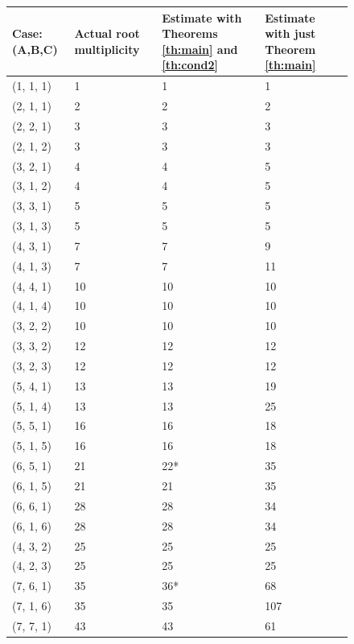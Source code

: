 \documentclass{amsart}
\numberwithin{equation}{section}
\numberwithin{figure}{section}
\numberwithin{table}{section}
\theoremstyle{definition}
\begin{document}
\begin{figure}
\begin{tabular}{|p{2cm}||p{3cm}|p{3cm}|p{3cm}|}
 \hline 
 Case: (A,B,C)  & Actual root multiplicity & Estimate with Theorems \ref{th:main} and \ref{th:cond2} & Estimate with just Theorem \ref{th:main}\\
 \hline
(1, 1, 1)   & 1      & 1      & 1      \\
(2, 1, 1)   & 2      & 2      & 2      \\
(2, 2, 1)   & 3      & 3      & 3      \\
(2, 1, 2)   & 3      & 3      & 3      \\
(3, 2, 1)   & 4      & 4      & 5      \\
(3, 1, 2)   & 4      & 4      & 5      \\
(3, 3, 1)   & 5      & 5      & 5      \\
(3, 1, 3)   & 5      & 5      & 5      \\
(4, 3, 1)   & 7      & 7      & 9      \\
(4, 1, 3)   & 7      & 7      & 11      \\
(4, 4, 1)   & 10     & 10     & 10     \\
(4, 1, 4)   & 10     & 10     & 10     \\
(3, 2, 2)   & 10     & 10     & 10     \\
(3, 3, 2)   & 12     & 12     & 12     \\
(3, 2, 3)   & 12     & 12     & 12     \\
(5, 4, 1)   & 13     & 13     & 19     \\
(5, 1, 4)   & 13     & 13     & 25     \\
(5, 5, 1)   & 16     & 16     & 18     \\
(5, 1, 5)   & 16     & 16     & 18     \\
(6, 5, 1)   & 21     & 22*     & 35     \\
(6, 1, 5)   & 21     & 21     & 35     \\
(6, 6, 1)   & 28     & 28     & 34     \\
(6, 1, 6)   & 28     & 28     & 34     \\
(4, 3, 2)   & 25     & 25     & 25     \\
(4, 2, 3)   & 25     & 25     & 25     \\
(7, 6, 1)   & 35     & 36*     & 68     \\
(7, 1, 6)   & 35     & 35     & 107     \\
(7, 7, 1)   & 43     & 43     & 61     \\

\end{tabular}
\end{figure}
\end{document}
